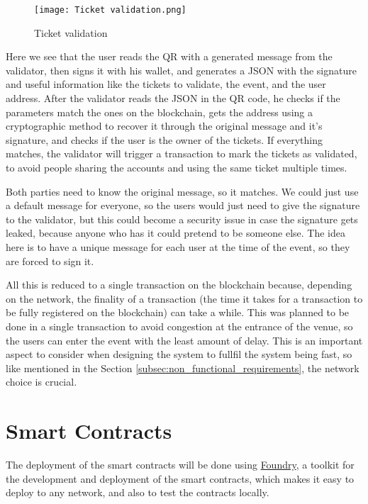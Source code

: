 \begin{figure}[H]
	\texttt{[image: Ticket validation.png]}
	\centering
	\caption{Ticket validation}
	\label{fig:ticket_validation}
\end{figure}

Here we see that the user reads the QR with a generated message from the
validator, then signs it with his wallet, and generates a JSON with the
signature and useful information like the tickets to validate, the event, and
the user address. After the validator reads the JSON in the QR code, he checks
if the parameters match the ones on the blockchain, gets the address using a
cryptographic method to recover it through the original message and it's
signature, and checks if the user is the owner of the tickets. If everything
matches, the validator will trigger a transaction to mark the tickets as
validated, to avoid people sharing the accounts and using the same ticket
multiple times.

Both parties need to know the original message, so it matches. We could just
use a default message for everyone, so the users would just need to give the
signature to the validator, but this could become a security issue in case the
signature gets leaked, because anyone who has it could pretend to be someone
else. The idea here is to have a unique message for each user at the time of
the event, so they are forced to sign it.

All this is reduced to a single transaction on the blockchain because,
depending on the network, the finality of a transaction (the time it takes for
a transaction to be fully registered on the blockchain) can take a while. This
was planned to be done in a single transaction to avoid congestion at the
entrance of the venue, so the users can enter the event with the least amount
of delay. This is an important aspect to consider when designing the system to
fullfil the system being fast, so like mentioned in the Section
\ref{subsec:non_functional_requirements}, the network choice is crucial.

\section{Smart Contracts}
\label{sec:smart_contracts}

The deployment of the smart contracts will be done using
\href{https://book.getfoundry.sh/}{Foundry}, a toolkit for the development and
deployment of the smart contracts, which makes it easy to deploy to any
network, and also to test the contracts locally.

